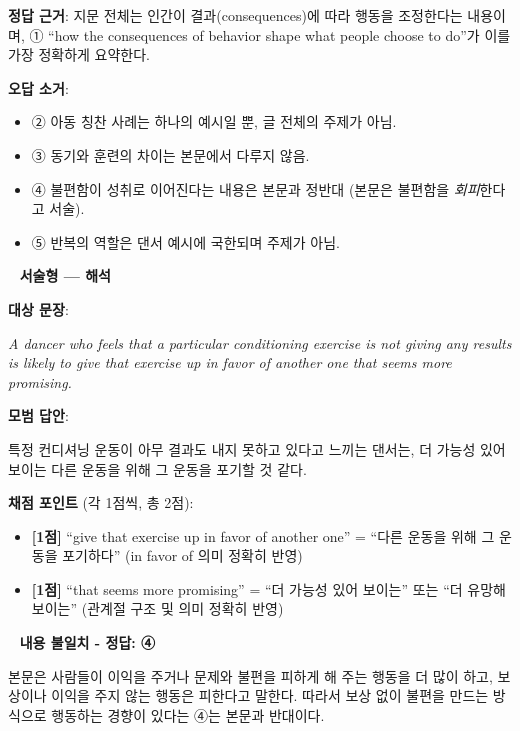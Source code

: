 \documentclass[11pt,a4paper]{article}
\newcommand{\qno}[1]{\par\vspace{10pt}\noindent{\sffamily\bfseries #1.}\ }
\begin{document}
\begin{pbox}
\textbf{정답 근거}: 지문 전체는 인간이 결과(consequences)에 따라 행동을 조정한다는 내용이며, ① ``how the consequences of behavior shape what people choose to do''가 이를 가장 정확하게 요약한다.

\medskip
\textbf{오답 소거}:
\begin{itemize}[leftmargin=1.5em,itemsep=1pt,topsep=2pt]
  \item ② 아동 칭찬 사례는 하나의 예시일 뿐, 글 전체의 주제가 아님.
  \item ③ 동기와 훈련의 차이는 본문에서 다루지 않음.
  \item ④ 불편함이 성취로 이어진다는 내용은 본문과 정반대 (본문은 불편함을 \textit{회피}한다고 서술).
  \item ⑤ 반복의 역할은 댄서 예시에 국한되며 주제가 아님.
\end{itemize}
\end{pbox}

\qno{3} \textsf{\bfseries 서술형 — 해석}

\begin{pbox}
\textbf{대상 문장}:\par
\hspace{1em}\textit{A dancer who feels that a particular conditioning exercise is not giving any results is likely to give that exercise up in favor of another one that seems more promising.}

\medskip
\textbf{모범 답안}:\par
\hspace{1em}특정 컨디셔닝 운동이 아무 결과도 내지 못하고 있다고 느끼는 댄서는, 더 가능성 있어 보이는 다른 운동을 위해 그 운동을 포기할 것 같다.

\medskip
\textbf{채점 포인트} (각 1점씩, 총 2점):
\begin{itemize}[leftmargin=1.5em,itemsep=1pt,topsep=2pt]
  \item \textbf{[1점]} ``give that exercise up in favor of another one'' = ``다른 운동을 위해 그 운동을 포기하다'' (in favor of 의미 정확히 반영)
  \item \textbf{[1점]} ``that seems more promising'' = ``더 가능성 있어 보이는'' 또는 ``더 유망해 보이는'' (관계절 구조 및 의미 정확히 반영)
\end{itemize}
\end{pbox}

\vspace{8pt}
\qno{4} \textsf{\bfseries 내용 불일치 - 정답: ④}
\begin{pbox}
본문은 사람들이 이익을 주거나 문제와 불편을 피하게 해 주는 행동을 더 많이 하고, 보상이나 이익을 주지 않는 행동은 피한다고 말한다. 따라서 보상 없이 불편을 만드는 방식으로 행동하는 경향이 있다는 ④는 본문과 반대이다.
\end{pbox}
\end{document}
